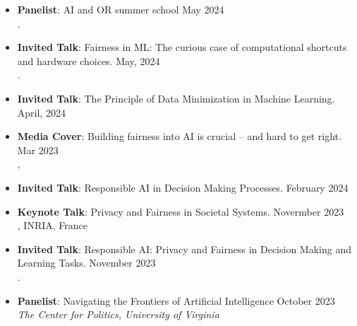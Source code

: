 
\vspace{6pt}
\begin{itemize}

  \item {\bf Panelist}: {AI and OR summer school} \hfill{May 2024}\\
  .

  \item {\bf Invited Talk}: Fairness in ML: The curious case of computational shortcuts and hardware choices. \hfill{May, 2024}\\
  .

  \item {\bf Invited Talk}: The Principle of Data Minimization in Machine Learning. \hfill{April, 2024}\\
  {}

  \item {\bf Media Cover}: 
  {Building fairness into AI is crucial – and hard to get right.} \hfill {Mar 2023} \\
  , 

  \item {\bf Invited Talk}: Responsible AI in Decision Making Processes. \hfill{February 2024}\\
  {}
  
  \item {\bf Keynote Talk}: {Privacy and Fairness in Societal Systems.} \hfill{Novermber 2023}\\
  {, INRIA, France}

  \item {\bf Invited Talk}: {Responsible AI: Privacy and Fairness in Decision Making and Learning Tasks.} \hfill{November 2023}\\
  {.}

  \item {\bf Panelist}: {Navigating the Frontiers of Artificial Intelligence} \hfill{October 2023}\\
  {\em  The Center for Politics, University of Virginia}


\end{itemize}
